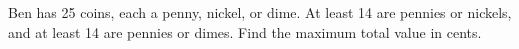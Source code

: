 Ben has 25 coins, each a penny, nickel, or dime. At least 14 are pennies or nickels, and at least 14 are pennies or dimes. Find the maximum total value in cents.
